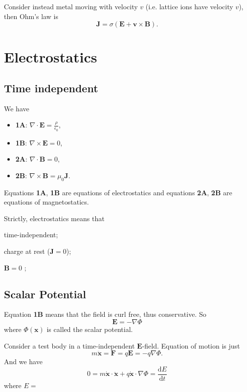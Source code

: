 Consider instead metal moving with velocity \(v\) (i.e. lattice ions have velocity \(v\)), then Ohm's law is
\[
    \mathbf{J}  = \sigma(\mathbf{E} + \mathbf{v} \times \mathbf{B}).
\]
\section{Electrostatics}
\subsection{Time independent}
We have
\begin{itemize}
    \item \textbf{1A}: \(\nabla \cdot \mathbf{E}  = \frac{\rho}{\epsilon_0}\),
    \item \textbf{1B}: \(\nabla \times \mathbf{E} = 0\),
    \item \textbf{2A}: \(\nabla \cdot \mathbf{B}  = 0\),
    \item \textbf{2B}: \(\nabla \times \mathbf{B} = \mu_0 \mathbf{J}\).
\end{itemize}
Equations \textbf{1A}, \textbf{1B} are equations of electrostatics and equations \textbf{2A}, \textbf{2B} are equations of magnetostatics.

Strictly, electrostatics means that
\begin{enumerate*}
    \item time-independent;
    \item charge at rest (\(\mathbf{J} = 0\));
    \item \(\mathbf{B} = 0\) ;
\end{enumerate*}
\subsection{Scalar Potential}
Equation \textbf{1B} means that the field is curl free, thus conservative. So
\[
    \mathbf{E} = -\nabla\Phi
\]
where \(\Phi(\mathbf{x} )\) is called the scalar potential.

Consider a test body in a time-independent \(\mathbf{E} \)-field. Equation of motion is just
\[
    m\ddot{\mathbf{x} } = \mathbf{F}  = q\mathbf{E} =-q \nabla  \Phi.
\]
And we have
\[
    0 = m\dot{\mathbf{x} }\cdot \ddot{\mathbf{x} } + q \dot{\mathbf{x} }\cdot \nabla \Phi = \frac{\mathrm{d}E}{\mathrm{d}t}
\]
where \(E = \) 